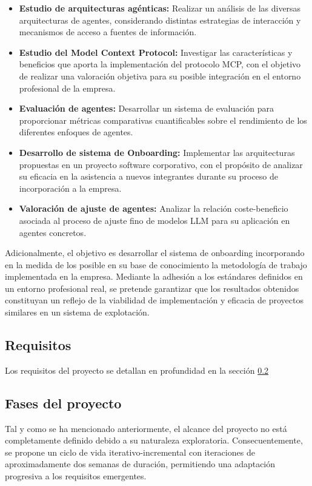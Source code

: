\begin{itemize}
  \item\textbf{Estudio de arquitecturas agénticas: }Realizar un análisis de las diversas arquitecturas de agentes, considerando distintas estrategias de interacción y mecanismos de acceso a fuentes de información.
  \item\textbf{Estudio del Model Context Protocol: }Investigar las características y beneficios que aporta la implementación del protocolo MCP, con el objetivo de realizar una valoración objetiva para su posible integración en el entorno profesional de la empresa.
  \item\textbf{Evaluación de agentes: }Desarrollar un sistema de evaluación para proporcionar métricas comparativas cuantificables sobre el rendimiento de los diferentes enfoques de agentes. 
  \item\textbf{Desarrollo de sistema de Onboarding: }Implementar las arquitecturas propuestas en un proyecto software corporativo, con el propósito de analizar su eficacia en la asistencia a nuevos integrantes durante su proceso de incorporación a la empresa.
  \item\textbf{Valoración de ajuste de agentes: }Analizar la relación coste-beneficio asociada al proceso de ajuste fino de modelos LLM para su aplicación en agentes concretos.
\end{itemize}

Adicionalmente, el objetivo es desarrollar el sistema de onboarding incorporando en la medida de los posible en su base de conocimiento la metodología de trabajo implementada en la empresa. Mediante la adhesión a los estándares definidos en un entorno profesional real, se pretende garantizar que los resultados obtenidos constituyan un reflejo de la viabilidad de implementación y eficacia de proyectos similares en un sistema de explotación. 

\subsection{Requisitos}
Los requisitos del proyecto se detallan en profundidad en la sección \ref{}

\subsection{Fases del proyecto}
Tal y como se ha mencionado anteriormente, el alcance del proyecto no está completamente definido debido a su naturaleza exploratoria. Consecuentemente, se propone un ciclo de vida iterativo-incremental con iteraciones de aproximadamente dos semanas de duración, permitiendo una adaptación progresiva a los requisitos emergentes.

